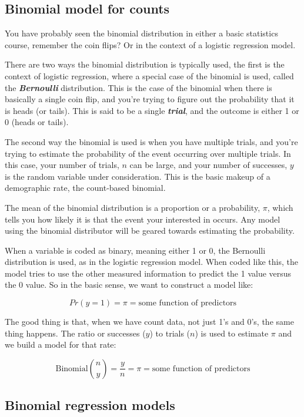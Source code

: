 \documentclass[
]{article}
\begin{document}
\hypertarget{binomial-model-for-counts}{%
\subsection{Binomial model for counts}\label{binomial-model-for-counts}}

You have probably seen the binomial distribution in either a basic statistics course, remember the coin flips? Or in the context of a logistic regression model.

There are two ways the binomial distribution is typically used, the first is the context of logistic regression, where a special case of the binomial is used, called the \textbf{\emph{Bernoulli}} distribution. This is the case of the binomial when there is basically a single coin flip, and you're trying to figure out the probability that it is heads (or tails). This is said to be a single \textbf{\emph{trial}}, and the outcome is either 1 or 0 (heads or tails).

The second way the binomial is used is when you have multiple trials, and you're trying to estimate the probability of the event occurring over multiple trials. In this case, your number of trials, \(n\) can be large, and your number of successes, \(y\) is the random variable under consideration. This is the basic makeup of a demographic rate, the count-based binomial.

The mean of the binomial distribution is a proportion or a probability, \(\pi\), which tells you how likely it is that the event your interested in occurs. Any model using the binomial distributor will be geared towards estimating the probability.

When a variable is coded as binary, meaning either 1 or 0, the Bernoulli distribution is used, as in the logistic regression model. When coded like this, the model tries to use the other measured information to predict the 1 value versus the 0 value. So in the basic sense, we want to construct a model like:

\[Pr(y=1) =\pi =  \text{some function of predictors}\]

The good thing is that, when we have count data, not just 1's and 0's, the same thing happens. The ratio or successes (\(y\)) to trials (\(n\)) is used to estimate \(\pi\) and we build a model for that rate:

\[\text{Binomial} \binom{n}{y} = \frac{y}{n} = \pi = \text{some function of predictors}\]

\hypertarget{binomial-regression-models}{%
\subsection{Binomial regression models}\label{binomial-regression-models}}
\end{document}
